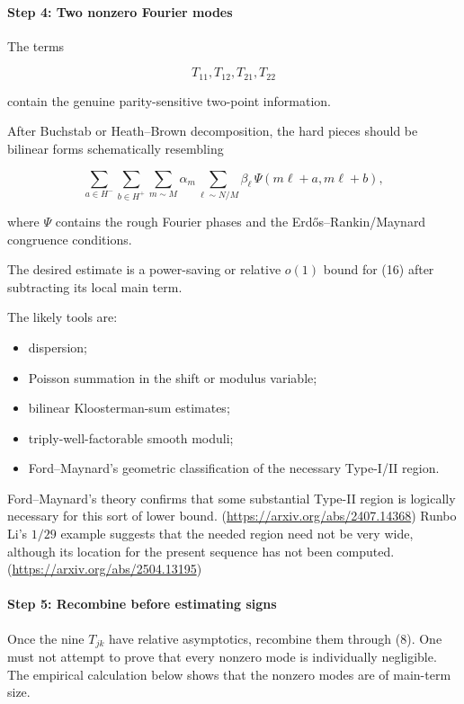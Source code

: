 \paragraph{Step 4: Two nonzero Fourier modes}

The terms

\[
T_{11},T_{12},T_{21},T_{22}
\]

contain the genuine parity-sensitive two-point information.

After Buchstab or Heath–Brown decomposition, the hard pieces should be bilinear forms schematically resembling

\[
\sum_{a\in H^-}
\sum_{b\in H^+}
\sum_{m\sim M}\alpha_m
\sum_{\ell\sim N/M}\beta_\ell\,
\Psi(m\ell+a,m\ell+b),
\tag{16}
\]

where \(\Psi\) contains the rough Fourier phases and the Erdős–Rankin/Maynard congruence conditions.

The desired estimate is a power-saving or relative \(o(1)\) bound for (16) after subtracting its local main term.

The likely tools are:

\begin{itemize}
\item dispersion;
\item Poisson summation in the shift or modulus variable;
\item bilinear Kloosterman-sum estimates;
\item triply-well-factorable smooth moduli;
\item Ford–Maynard’s geometric classification of the necessary Type-I/II region.
\end{itemize}

Ford–Maynard’s theory confirms that some substantial Type-II region is logically necessary for this sort of lower bound. (\url{https://arxiv.org/abs/2407.14368}) Runbo Li’s \(1/29\) example suggests that the needed region need not be very wide, although its location for the present sequence has not been computed. (\url{https://arxiv.org/abs/2504.13195})

\paragraph{Step 5: Recombine before estimating signs}

Once the nine \(T_{jk}\) have relative asymptotics, recombine them through (8). One must not attempt to prove that every nonzero mode is individually negligible. The empirical calculation below shows that the nonzero modes are of main-term size.

